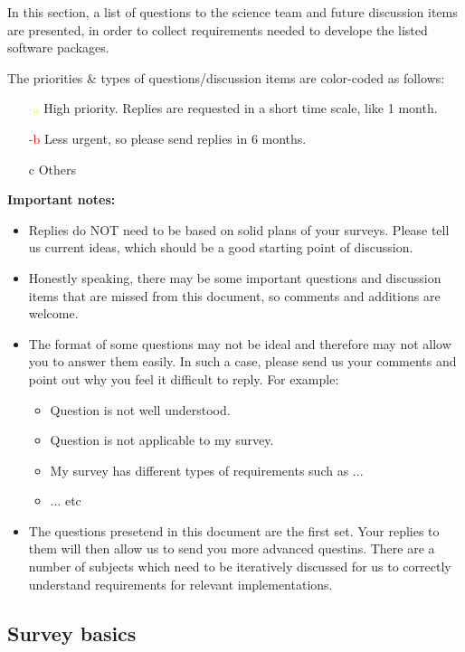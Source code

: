 \documentclass[a4paper,notitlepage]{article}
\newcommand{\cols}[1]{\textcolor{red}{\thesubsubsection-#1}}
\newcommand{\colm}[1]{\textcolor{yellow}{\thesubsubsection-#1}}
\begin{document}
In this section, a list of questions to the science team and future
discussion items are presented, in order to collect requirements needed
to develope the listed software packages.

The priorities \& types of questions/discussion items are color-coded as
follows:
\begin{enumerate}
  \item[\colm{a}] High priority. Replies are requested in a short time
           scale, like 1 month.
  \item[\cols{b}] Less urgent, so please send replies in 6 months.
  \item[c] Others
\end{enumerate}

{\bf Important notes:}
\begin{itemize}
 \item Replies do NOT need to be based on solid plans of your
   surveys. Please tell us current ideas, which should be a good
   starting point of discussion.
 \item Honestly speaking, there may be some important questions and
       discussion items that are missed from this document, so comments
       and additions are welcome.
 \item The format of some questions may not be ideal and therefore may
       not allow you to answer them easily. In such a case, please send
       us your comments and point out why you feel it difficult to
       reply. For example:
       \begin{itemize}
    \item Question is not well understood.
    \item Question is not applicable to my survey.
    \item My survey has different types of requirements such as ... 
    \item ... etc
       \end{itemize}
 \item The questions presetend in this document are the first
   set. Your replies to them will then allow us to send you more
   advanced questins. There are a number of subjects which need to be
   iteratively discussed for us to correctly understand requirements
   for relevant implementations.
\end{itemize}

\subsection{Survey basics}
\end{document}
